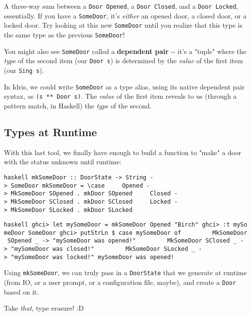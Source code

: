 \documentclass[]{article}
\begin{document}
A three-way sum between a \texttt{Door\ \textquotesingle{}Opened}, a
\texttt{Door\ \textquotesingle{}Closed}, and a
\texttt{Door\ \textquotesingle{}Locked}, essentially. If you have a
\texttt{SomeDoor}, it's \emph{either} an opened door, a closed door, or a locked
door. Try looking at this new \texttt{SomeDoor} until you realize that this type
is the same type as the previous \texttt{SomeDoor}!

You might also see \texttt{SomeDoor} called a \textbf{dependent pair} -\/- it's
a "tuple" where the \emph{type} of the second item (our \texttt{Door\ s}) is
determined by the \emph{value} of the first item (our \texttt{Sing\ s}).

In Idris, we could write \texttt{SomeDoor} as a type alias, using its native
dependent pair syntax, as \texttt{(s\ **\ Door\ s)}. The \emph{value} of the
first item reveals to us (through a pattern match, in Haskell) the \emph{type}
of the second.

\subsection{Types at Runtime}

With this last tool, we finally have enough to build a function to "make" a door
with the status unknown until runtime:

\texttt{haskell\ mkSomeDoor\ ::\ DoorState\ -\textgreater{}\ String\ -\textgreater{}\ SomeDoor\ mkSomeDoor\ =\ \textbackslash{}case\ \ \ \ \ Opened\ -\textgreater{}\ MkSomeDoor\ SOpened\ .\ mkDoor\ SOpened\ \ \ \ \ Closed\ -\textgreater{}\ MkSomeDoor\ SClosed\ .\ mkDoor\ SClosed\ \ \ \ \ Locked\ -\textgreater{}\ MkSomeDoor\ SLocked\ .\ mkDoor\ SLocked}

\texttt{haskell\ ghci\textgreater{}\ let\ mySomeDoor\ =\ mkSomeDoor\ Opened\ "Birch"\ ghci\textgreater{}\ :t\ mySomeDoor\ SomeDoor\ ghci\textgreater{}\ putStrLn\ \$\ case\ mySomeDoor\ of\ \ \ \ \ \ \ \ \ MkSomeDoor\ SOpened\ \_\ -\textgreater{}\ "mySomeDoor\ was\ opened!"\ \ \ \ \ \ \ \ \ MkSomeDoor\ SClosed\ \_\ -\textgreater{}\ "mySomeDoor\ was\ closed!"\ \ \ \ \ \ \ \ \ MkSomeDoor\ SLocked\ \_\ -\textgreater{}\ "mySomeDoor\ was\ locked!"\ mySomeDoor\ was\ opened!}

Using \texttt{mkSomeDoor}, we can truly pass in a \texttt{DoorState} that we
generate at runtime (from IO, or a user prompt, or a configuration file, maybe),
and create a \texttt{Door} based on it.

Take \emph{that}, type erasure! :D
\end{document}
